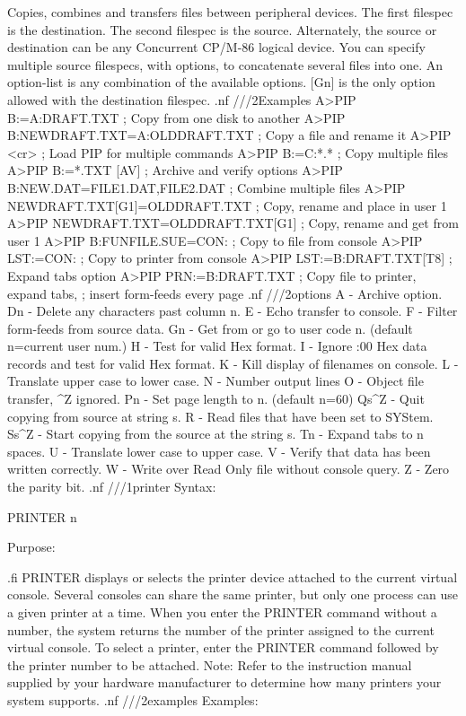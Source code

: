 Copies, combines and transfers files between peripheral devices. 
The first filespec is the destination. The second filespec is the 
source.  Alternately, the source or destination can be any Concurrent 
CP/M-86 logical device.  You can specify multiple source filespecs, 
with options, to concatenate several files into one. An option-list 
is any combination of the available options. [Gn] is the only 
option allowed with the destination filespec.
.nf
///2Examples
A>PIP B:=A:DRAFT.TXT                 ; Copy from one disk to another
A>PIP B:NEWDRAFT.TXT=A:OLDDRAFT.TXT  ; Copy a file and rename it
A>PIP <cr>                           ; Load PIP for multiple commands
A>PIP B:=C:*.*                       ; Copy multiple files
A>PIP B:=*.TXT [AV]                  ; Archive and verify options
A>PIP B:NEW.DAT=FILE1.DAT,FILE2.DAT  ; Combine multiple files
A>PIP NEWDRAFT.TXT[G1]=OLDDRAFT.TXT  ; Copy, rename and place in user 1
A>PIP NEWDRAFT.TXT=OLDDRAFT.TXT[G1]  ; Copy, rename and get from user 1
A>PIP B:FUNFILE.SUE=CON:             ; Copy to file from console
A>PIP LST:=CON:                      ; Copy to printer from console
A>PIP LST:=B:DRAFT.TXT[T8]           ; Expand tabs option
A>PIP PRN:=B:DRAFT.TXT               ; Copy file to printer, expand tabs,
                                     ; insert form-feeds every page
.nf
///2options
A    - Archive option.
Dn   - Delete any characters past column n.
E    - Echo transfer to console.
F    - Filter form-feeds from source data.
Gn   - Get from or go to user code n. (default n=current user num.)
H    - Test for valid Hex format.
I    - Ignore :00 Hex data records and test for valid Hex format.
K    - Kill display of filenames on console.
L    - Translate upper case to lower case.
N    - Number output lines
O    - Object file transfer, ^Z ignored.
Pn   - Set page length to n. (default n=60)
Qs^Z - Quit copying from source at string s.
R    - Read files that have been set to SYStem.
Ss^Z - Start copying from the source at the string s.
Tn   - Expand tabs to n spaces.
U    - Translate lower case to upper case.
V    - Verify that data has been written correctly.
W    - Write over Read Only file without console query.
Z    - Zero the parity bit.
.nf
///1printer
Syntax:

PRINTER {n}

Purpose:

.fi
PRINTER displays or selects the printer device attached to the
current virtual console. Several consoles can share the same 
printer, but only one process can use a given printer at a time. 
When you enter the PRINTER command without a number, the system 
returns the number of the printer assigned to the current virtual 
console. To select a printer, enter the PRINTER command followed 
by the printer number to be attached. Note: Refer to the instruction 
manual supplied by your hardware manufacturer to determine how many 
printers your system supports.
.nf
///2examples
Examples:

